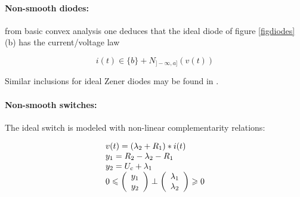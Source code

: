 \documentclass{article}
\def\geq{\geqslant}
\def\leq{\leqslant}
\begin{document}
\paragraph{Non-smooth  diodes:} from basic convex analysis one deduces that the ideal diode of figure \ref{figdiodes} (b) has the current/voltage law 

\begin{equation}
i(t) \in \{b\}+N_{]-\infty,a]}(v(t))
\end{equation} 

Similar inclusions for ideal Zener diodes may be found in \cite{acary-brogliato2008,addi2009}. 


\paragraph{Non-smooth switches:} The ideal switch is modeled with non-linear complementarity relations:

\begin{equation}
  \label{eq:63}
  \begin{array}[l]{l}
    v(t)=(\lambda_2+R_1)*i(t) \\
    y_1=R_2-\lambda_2-R_1\\
    y_2=U_c+\lambda_1\\
    0 \leq \left(\begin{array}{c}
y_1\\
y_2
  \end{array}\right) \perp \left(\begin{array}{c}
\lambda_1\\
\lambda_2
  \end{array}\right) \geq 0
\end{array}
\end{equation}
\end{document}
